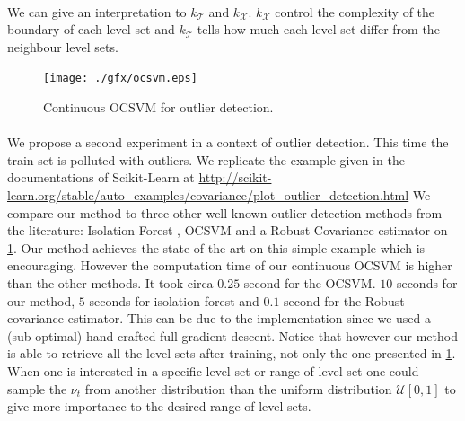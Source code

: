 \paragraph{}
We can give an interpretation to $k_{\mathcal{T}}$ and $k_{\mathcal{X}}$.
$k_{\mathcal{X}}$ control the complexity of the boundary of each level set and
$k_{\mathcal{T}}$ tells how much each level set differ from the neighbour level
sets.
\begin{figure}
    {\centering\texttt{[image: ./gfx/ocsvm.eps]}}
    \caption[Continuous OCSVM for outlier detection]{Continuous OCSVM for
    outlier detection. \label{fig:ocsvm_outlier}}
\end{figure}
\paragraph{}
We propose a second experiment in a context of outlier detection. This time
the train set is polluted with outliers. We replicate the example given in
the documentations of Scikit-Learn at
\url{http://scikit-learn.org/stable/auto_examples/covariance/plot_outlier_detection.html}
We compare our method to three other well known outlier detection methods
from the literature: Isolation Forest \citep{Liu2008}, \acs{OCSVM}
\citep{Scholkopf2001} and a Robust Covariance estimator
\citep{campbell1980robust, pedregosa2011scikit} on \cref{fig:ocsvm_outlier}.
Our method achieves the state of the art on this simple example which is
encouraging. However the computation time of our continuous \acs{OCSVM} is
higher than the other methods. It took circa $0.25$ second for the \acs{OCSVM}.
$10$ seconds for our method, $5$ seconds for isolation forest and $0.1$ second
for the Robust covariance estimator. This can be due to the implementation since we used
a (sub-optimal) hand-crafted full gradient descent. Notice that however our
method is able to retrieve all the level sets after training, not only the one
presented in \cref{fig:ocsvm_outlier}.  When one is interested in a specific
level set or range of level set one could sample the $\nu_t$ from another
distribution than the uniform distribution $\mathcal{U}[0, 1]$ to give more
importance to the desired range of level sets.


